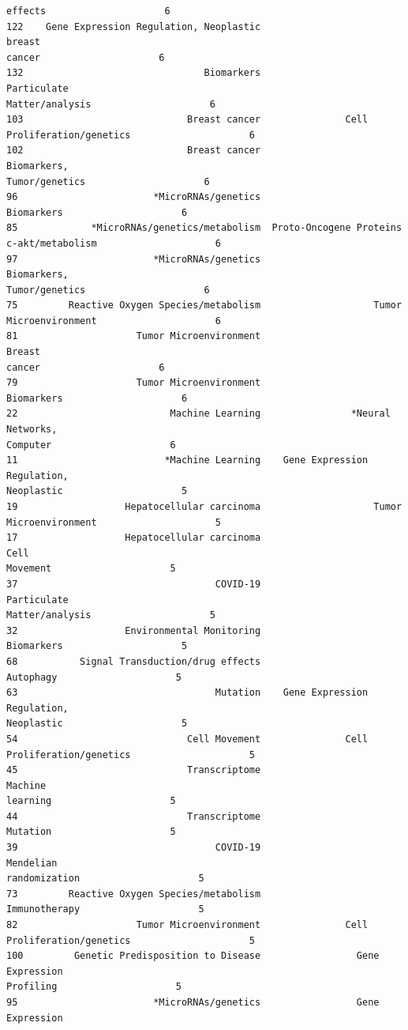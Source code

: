 \documentclass[11pt]{article}
\begin{document}
\begin{Verbatim}[commandchars=\\\{\}]
effects                     6
122    Gene Expression Regulation, Neoplastic                             breast
cancer                     6
132                                Biomarkers               Particulate
Matter/analysis                     6
103                             Breast cancer               Cell
Proliferation/genetics                     6
102                             Breast cancer                Biomarkers,
Tumor/genetics                     6
96                        *MicroRNAs/genetics
Biomarkers                     6
85             *MicroRNAs/genetics/metabolism  Proto-Oncogene Proteins
c-akt/metabolism                     6
97                        *MicroRNAs/genetics                Biomarkers,
Tumor/genetics                     6
75         Reactive Oxygen Species/metabolism                    Tumor
Microenvironment                     6
81                     Tumor Microenvironment                             Breast
cancer                     6
79                     Tumor Microenvironment
Biomarkers                     6
22                           Machine Learning                *Neural Networks,
Computer                     6
11                          *Machine Learning    Gene Expression Regulation,
Neoplastic                     5
19                   Hepatocellular carcinoma                    Tumor
Microenvironment                     5
17                   Hepatocellular carcinoma                             Cell
Movement                     5
37                                   COVID-19               Particulate
Matter/analysis                     5
32                   Environmental Monitoring
Biomarkers                     5
68           Signal Transduction/drug effects
Autophagy                     5
63                                   Mutation    Gene Expression Regulation,
Neoplastic                     5
54                              Cell Movement               Cell
Proliferation/genetics                     5
45                              Transcriptome                          Machine
learning                     5
44                              Transcriptome
Mutation                     5
39                                   COVID-19                   Mendelian
randomization                     5
73         Reactive Oxygen Species/metabolism
Immunotherapy                     5
82                     Tumor Microenvironment               Cell
Proliferation/genetics                     5
100         Genetic Predisposition to Disease                 Gene Expression
Profiling                     5
95                        *MicroRNAs/genetics                 Gene Expression

\end{Verbatim}
\end{document}

